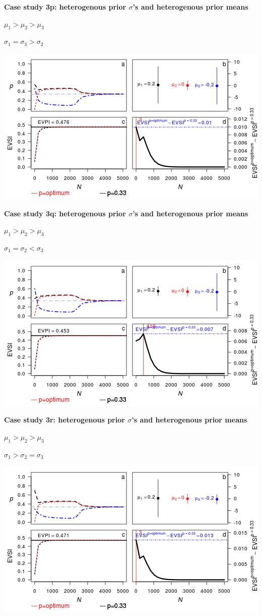 \textbf{Case study 3p: heterogenous prior \(\sigma\)'s and heterogenous
prior means}

\(\mu_1 > \mu_2 > \mu_3\)

\(\sigma_1 = \sigma_3 > \sigma_2\)

\includegraphics{figure/x10n1__1_1__1c-1.png} \clearpage  

\textbf{Case study 3q: heterogenous prior \(\sigma\)'s and heterogenous
prior means}

\(\mu_1 > \mu_2 > \mu_3\)

\(\sigma_1 = \sigma_2 < \sigma_3\)

\includegraphics{figure/x10n1_1_1__1c-1.png} \clearpage

\textbf{Case study 3r: heterogenous prior \(\sigma\)'s and heterogenous
prior means}

\(\mu_1 > \mu_2 > \mu_3\)

\(\sigma_1 > \sigma_2 = \sigma_3\)

\includegraphics{figure/x10n1__1_1_1c-1.png} \clearpage

